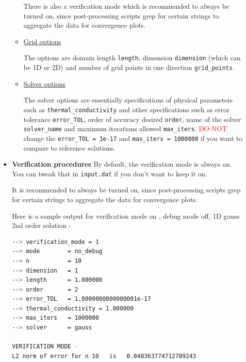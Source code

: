 \documentclass[12 pt, final]{article}
\begin{document}
\begin{itemize}
\begin{itemize}
        There is also a verification mode which is recommended to always be turned on, since post-processing scripts grep for certain strings to aggregate the data for convergence plots. 
        \item \underline{Grid options}
        
        The options are domain length \texttt{length}, dimension \texttt{dimension} (which can be 1D or 2D) and number of grid points in one direction \texttt{grid\_points}. 
        \item \underline{Solver options}
        
        The solver options are essentially specifications of physical parameters such as \texttt{thermal\_conductivity} and other specifications such as error tolerance \texttt{error\_TOL}, order of accuracy desired \texttt{order}, name of the solver \texttt{solver\_name} and maximum iterations allowed \texttt{max\_iters}. \textcolor{red}{DO NOT} change the \texttt{error\_TOL = 1e-17} and \texttt{max\_iters = 1000000} if you want to compare to reference solutions.
    \end{itemize}
    \item \textbf{Verification procedures}
    By default, the verification mode is always on. You can tweak that in \texttt{input.dat} if you don't want to keep it on.
    
    It is recommended to always be turned on, since post-processing scripts grep for certain strings to aggregate the data for convergence plots.
    
    Here is a sample output for verification mode on , debug mode off, 1D gauss 2nd order solution -
    \begin{lstlisting}[language = bash, basicstyle=\tiny]
--> verification_mode = 1
--> mode        = no_debug
--> n           = 10
--> dimension   = 1
--> length      = 1.000000
--> order       = 2
--> error_TOL   = 1.0000000000000001e-17
--> thermal_conductivity = 1.000000
--> max_iters   = 1000000
--> solver      = gauss

VERIFICATION MODE -
L2 norm of error for n 10   is   0.048363774712789243


\end{lstlisting}
\end{itemize}
\end{document}
